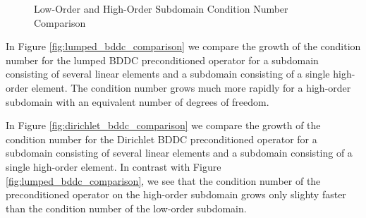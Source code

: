 \begin{figure}[!ht]
  \centering
  \hfill
  \caption{Low-Order and High-Order Subdomain Condition Number Comparison}
\end{figure}

In Figure \ref{fig:lumped_bddc_comparison} we compare the growth of the condition number for the lumped BDDC preconditioned operator for a subdomain consisting of several linear elements and a subdomain consisting of a single high-order element.
The condition number grows much more rapidly for a high-order subdomain with an equivalent number of degrees of freedom.

In Figure \ref{fig:dirichlet_bddc_comparison} we compare the growth of the condition number for the Dirichlet BDDC preconditioned operator for a subdomain consisting of several linear elements and a subdomain consisting of a single high-order element.
In contrast with Figure \ref{fig:lumped_bddc_comparison}, we see that the condition number of the preconditioned operator on the high-order subdomain grows only slighty faster than the condition number of the low-order subdomain.
